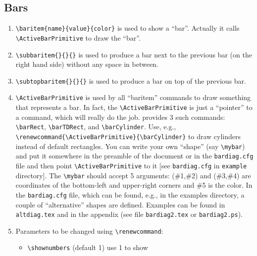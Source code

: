 \documentclass[12pt]{article}
\begin{document}
\subsection{Bars \label{sec:3.3}}
\begin{enumerate}
\item \verb+\baritem{name}{value}{color}+ 
  is used to show a
  ``bar''. Actually it calls\\ \verb+\ActiveBarPrimitive+ 
  to draw the ``bar''.
\item \verb+\subbaritem{}{}{}+ 
  is used to produce a bar next to the
  previous bar (on the right hand side) without any space in between.
\item \verb+\subtopbaritem{}{}{}+ 
  is used to produce a bar on top of
  the previous bar.
\item \verb+\ActiveBarPrimitive+ 
  is used by all ``baritem'' commands
  to draw something that represents a bar. In fact, the
  \verb+\ActiveBarPrimitive+ is just a ``pointer'' to a command, which
  will really do the job. \bard provides 3 such commands:
  \verb+\barRect+,  
  \verb+\barTDRect+, 
  and \verb+\barCylinder+.  
  Use,
  e.g., \verb+\renewcommand{\ActiveBarPrimitive}{\barCylinder}+ to
  draw cylinders instead of default rectangles. You can write your own
  ``shape'' (say \verb+\mybar+) 
  and put it somewhere in the preamble of the document or in
  the \texttt{bardiag.cfg} file and then point
  \verb+\ActiveBarPrimitive+ to it [see \texttt{bardiag.cfg} in
  \texttt{example} directory]. The \verb+\mybar+
  should accept 5 arguments: (\#1,\#2) and (\#3,\#4) are coordinates
  of the bottom-left and upper-right corners and \#5 is the color.
  In the \texttt{bardiag.cfg} file, which can be found, e.g., in the
  examples directory, a couple of ``alternative'' shapes are defined. 
  Examples can be found in \texttt{altdiag.tex} and in the appendix 
  (see file \texttt{bardiag2.tex} or \texttt{bardiag2.ps}).
%
\item Parameters to be changed using \verb+\renewcommand+:
      \begin{itemize} 
        \item \verb+\shownumbers+  
          (default 1) use 1 to show 

\end{itemize}
\end{enumerate}
\end{document}
